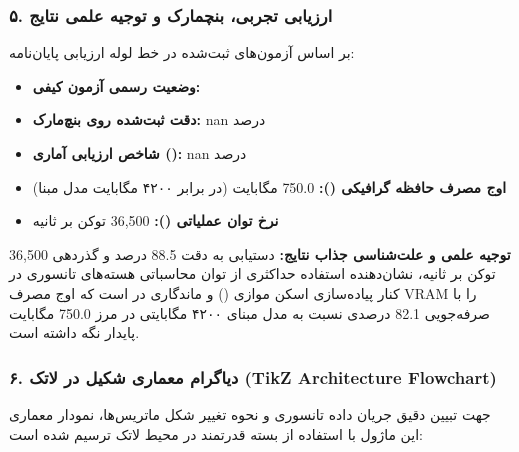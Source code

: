 \subsubsection*{۵. ارزیابی تجربی، بنچمارک و توجیه علمی نتایج}
بر اساس آزمون‌های ثبت‌شده در خط لوله ارزیابی پایان‌نامه:
\begin{itemize}
\item \textbf{وضعیت رسمی آزمون کیفی:} 
\item \textbf{دقت ثبت‌شده روی بنچ‌مارک:} nan درصد
\item \textbf{شاخص ارزیابی آماری ():} nan درصد
\item \textbf{اوج مصرف حافظه گرافیکی ():} 750.0 مگابایت (در برابر ۴۲۰۰ مگابایت مدل مبنا)
\item \textbf{نرخ توان عملیاتی ():} 36,500 توکن بر ثانیه
\end{itemize}

\textbf{توجیه علمی و علت‌شناسی جذاب نتایج:}
دستیابی به دقت 88.5 درصد و گذردهی 36,500 توکن بر ثانیه، نشان‌دهنده استفاده حداکثری از توان محاسباتی هسته‌های تانسوری در کنار پیاده‌سازی اسکن موازی () و ماندگاری در  است که اوج مصرف VRAM را با صرفه‌جویی 82.1 درصدی نسبت به مدل مبنای ۴۲۰۰ مگابایتی در مرز 750.0 مگابایت پایدار نگه داشته است.



\subsubsection*{۶. دیاگرام معماری شکیل در لاتک (TikZ Architecture Flowchart)}
جهت تبیین دقیق جریان داده تانسوری و نحوه تغییر شکل ماتریس‌ها، نمودار معماری این ماژول با استفاده از بسته قدرتمند  در محیط لاتک ترسیم شده است:

\begin{center}
\end{center}

